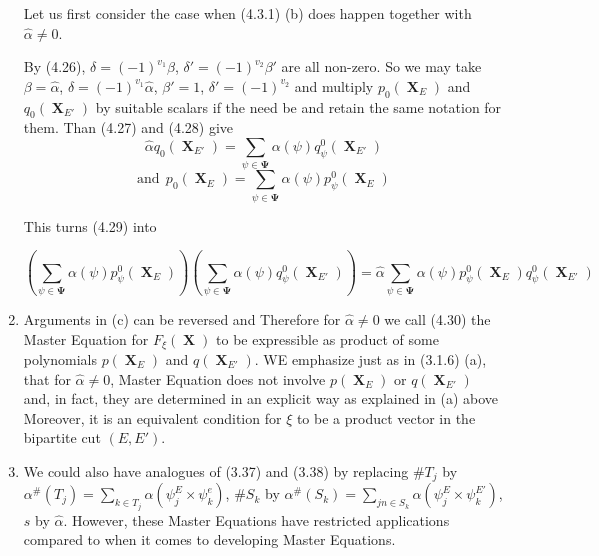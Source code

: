 \documentclass[a4paper,12pt]{article}
\DeclareMathOperator{\x}{\mathrm{X}}
\theoremstyle{definition}
\theoremstyle{underlinethm}
\theoremstyle{definition}
\begin{document}
\begin{enumerate}[label=(\alph*)]
Let us first consider the case when (4.3.1) (b) does happen together with $\hat{\alpha} \neq 0$.

By (4.26), $\delta = (-1)^{v_{1}}\beta$, $\delta' =(-1)^{v_{2}}\beta'$ are all non-zero. So we may take $\beta = \hat{\alpha}$, $\delta = (-1)^{v_{1}} \hat{\alpha}$, $\beta' =1$, $\delta' = (-1)^{v_{2}}$ and multiply $p_{0}(\boldsymbol{\x}_{E})$ and $q_{0}(\boldsymbol{\x}_{E'})$ by suitable scalars if the need be and retain the same notation for them. Than (4.27) and (4.28) give
$$
\hat{\alpha} q_{0} (\boldsymbol{\x}_{E'}) = \sum_{\psi \in \boldsymbol{\Psi}} \alpha(\psi) q_{\psi}^{0}(\boldsymbol{\x}_{E'})
$$
$$
\text{and}~~ p_{0} (\boldsymbol{\x}_{E}) = \sum_{\psi \in \boldsymbol{\Psi}} \alpha(\psi) p_{\psi}^{0}(\boldsymbol{\x}_{E})
$$

This turns (4.29) into

\begin{equation}
\left(\sum_{\psi \in \boldsymbol{\Psi}} \alpha(\psi) p_{\psi}^{0} (\boldsymbol{\x}_{E}) \right) \left(\sum_{\psi \in \boldsymbol{\Psi}} \alpha(\psi) q_{\psi}^{0} (\boldsymbol{\x}_{E'}) \right) = \hat{\alpha} \sum_{\psi \in \boldsymbol{\Psi}} \alpha(\psi) p_{\psi}^{0} (\boldsymbol{\x}_{E}) q_{\psi}^{0} (\boldsymbol{\x}_{E'})\tag{4.30}\label{eq-4.30}
\end{equation}

\item Arguments in (c) can be reversed and Therefore for $\hat{\alpha} \neq 0$ we call (4.30) the Master Equation for $F_{\xi}(\boldsymbol{\x})$ to be expressible as product of some polynomials $p(\boldsymbol{\x}_{E})$ and $q(\boldsymbol{\x}_{E'})$. WE emphasize just as in (3.1.6) (a), that for $\hat{\alpha} \neq 0$, Master Equation does not involve $p(\boldsymbol{\x}_{E})$ or $q(\boldsymbol{\x}_{E'})$ and, in fact, they are determined in an explicit way as explained in (a) above Moreover, it is an equivalent condition for $\xi$ to be a product vector in the bipartite cut $(E, E')$.

\item We could also have analogues of (3.37) and (3.38)  by replacing $\# T_{j}$ by $\alpha^{\#}(T_{j}) =\sum_{k \in T_{j}} \alpha (\psi_{j}^{E} \times \psi_{k}^{e})$, $\# S_{k}$ by $\alpha^{\#}(S_{k}) =\sum_{jn\in S_{k}} \alpha (\psi_{j}^{E} \times \psi_{k}^{E'})$, $s$ by $\hat{\alpha}$. However, these Master Equations have restricted applications compared to when it comes to developing Master Equations.


\end{enumerate}
\end{document}
